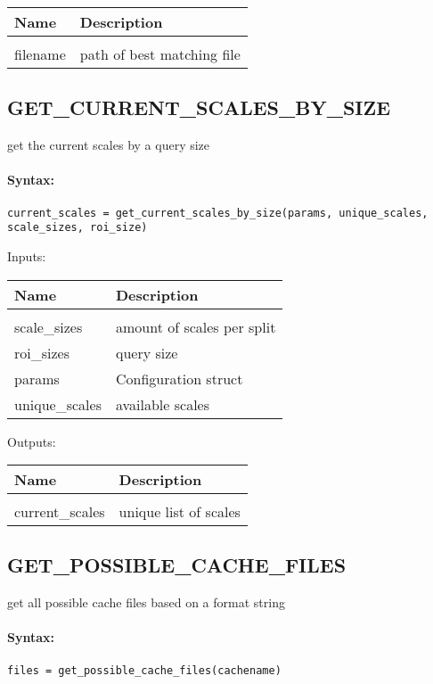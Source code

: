 \begin{tabular}{|l|p{5cm}|}
\hline
\textbf{Name} & \textbf{Description} \\
\hline \hline \\
filename & path of best matching file  \\ \hline
\end{tabular}

\subsection{GET\_CURRENT\_SCALES\_BY\_SIZE}

get the current scales by a query size

\paragraph{Syntax:} \verb|current_scales = get_current_scales_by_size(params, unique_scales, scale_sizes, roi_size)|

Inputs:

\begin{tabular}{|l|p{5cm}|}
\hline
\textbf{Name} & \textbf{Description} \\
\hline \hline \\
scale\_sizes & amount of scales per split  \\ \hline
roi\_sizes & query size  \\ \hline
params & Configuration struct  \\ \hline
unique\_scales & available scales  \\ \hline
\end{tabular}
Outputs:

\begin{tabular}{|l|p{5cm}|}
\hline
\textbf{Name} & \textbf{Description} \\
\hline \hline \\
current\_scales & unique list of scales  \\ \hline
\end{tabular}

\subsection{GET\_POSSIBLE\_CACHE\_FILES}

get all possible cache files based on a format string

\paragraph{Syntax:} \verb|files = get_possible_cache_files(cachename)|

